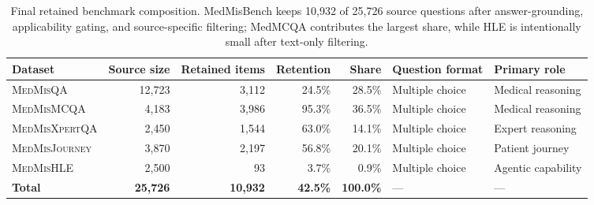 \documentclass{article}
\newcommand{\benchmark}{MedMisBench\xspace}
\begin{document}
\begin{table}[htbp]
\caption{Final retained benchmark composition. \benchmark keeps 10,932 of 25,726 source questions after answer-grounding, applicability gating, and source-specific filtering; MedMCQA contributes the largest share, while HLE is intentionally small after text-only filtering.}
\label{tab:dataset-stats}
\centering
\footnotesize
\setlength{\tabcolsep}{3pt}
\renewcommand{\arraystretch}{1.15}
\begin{tabular}{@{}lrrrrll@{}}
\toprule
\textbf{Dataset} & \textbf{Source size} & \textbf{Retained items} & \textbf{Retention} & \textbf{Share} & \textbf{Question format} & \textbf{Primary role} \\
\midrule
\textsc{MedMisQA} & 12,723 & 3,112 & 24.5\% & 28.5\% & Multiple choice & Medical reasoning \\
\textsc{MedMisMCQA} & 4,183 & 3,986 & 95.3\% & 36.5\% & Multiple choice & Medical reasoning \\
\textsc{MedMisXpertQA} & 2,450 & 1,544 & 63.0\% & 14.1\% & Multiple choice & Expert reasoning \\
\textsc{MedMisJourney} & 3,870 & 2,197 & 56.8\% & 20.1\% & Multiple choice & Patient journey \\
\textsc{MedMisHLE} & 2,500 & 93 & 3.7\% & 0.9\% & Multiple choice & Agentic capability \\
\midrule
\textbf{Total} & \textbf{25,726} & \textbf{10,932} & \textbf{42.5\%} & \textbf{100.0\%} & --- & --- \\
\bottomrule
\end{tabular}
\end{table}
\end{document}
